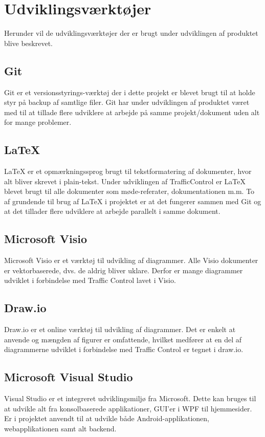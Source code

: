 \section{Udviklingsværktøjer}
	Herunder vil de udviklingsværktøjer der er brugt under udviklingen af 
	produktet blive beskrevet.
	
	\subsection*{Git}
	Git\cite{GitRef} er et versionsstyrings-værktøj der i dette projekt er 
	blevet brugt til at holde styr på backup af samtlige filer. Git har under 
	udviklingen af produktet været med til at tillade flere udviklere at 
	arbejde på samme projekt/dokument uden alt for mange problemer.
	
	\subsection*{\LaTeX}
	\LaTeX \cite{LatexRef} er et opmærkningssprog brugt til tekstformatering af 
	dokumenter, hvor alt bliver skrevet i plain-tekst. Under udviklingen af 
	TrafficControl er LaTeX blevet brugt til alle dokumenter som 
	møde-referater, dokumentationen m.m. To af grundende til brug af LaTeX i 
	projektet er at det fungerer sammen med Git og at det tillader flere 
	udviklere at arbejde parallelt i samme dokument.
	
	\subsection*{Microsoft Visio}
	Microsoft Visio\cite{VisioRef} er et værktøj til udvikling af diagrammer. 
	Alle Visio dokumenter er vektorbaserede, dvs. de aldrig bliver uklare. 
	Derfor er mange diagrammer udviklet i forbindelse med Traffic Control lavet 
	i Visio.
	
	\subsection*{Draw.io}
	Draw.io\cite{Draw.io} er et online værktøj til udvikling af diagrammer. 
	Det er enkelt at anvende og mængden af figurer er omfattende, hvilket medfører at en del af diagrammerne udviklet i forbindelse med Traffic Control er tegnet i draw.io.
	
	\subsection*{Microsoft Visual Studio}
	Visual Studio\cite{VisualStudio} er et integreret udviklingsmiljø fra 
	Microsoft. Dette kan 	bruges til at udvikle alt fra konsolbaserede 
	applikationer, GUI'er i WPF til hjemmesider. Er i projektet anvendt til at 
	udvikle både Android-applikationen, webapplikationen samt alt backend.
		

